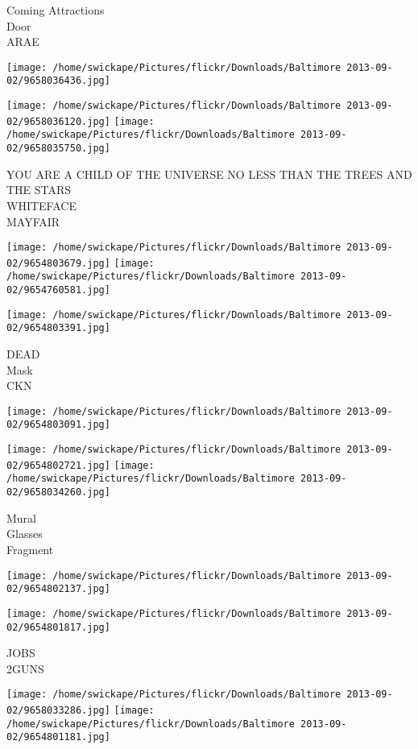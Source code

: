 \documentclass[10pt,letterpaper]{article}
\begin{document}
Coming Attractions\\
Door\\
ARAE
\pagebreak

\texttt{[image: /home/swickape/Pictures/flickr/Downloads/Baltimore 2013-09-02/9658036436.jpg]}

\vspace{0.25in}
\texttt{[image: /home/swickape/Pictures/flickr/Downloads/Baltimore 2013-09-02/9658036120.jpg]}
\texttt{[image: /home/swickape/Pictures/flickr/Downloads/Baltimore 2013-09-02/9658035750.jpg]}

YOU ARE A CHILD OF THE UNIVERSE NO LESS THAN THE TREES AND THE STARS\\
WHITEFACE\\
MAYFAIR
\pagebreak

\texttt{[image: /home/swickape/Pictures/flickr/Downloads/Baltimore 2013-09-02/9654803679.jpg]}
\texttt{[image: /home/swickape/Pictures/flickr/Downloads/Baltimore 2013-09-02/9654760581.jpg]}

\vspace{0.25in}
\texttt{[image: /home/swickape/Pictures/flickr/Downloads/Baltimore 2013-09-02/9654803391.jpg]}

DEAD\\
Mask\\
CKN
\pagebreak

\texttt{[image: /home/swickape/Pictures/flickr/Downloads/Baltimore 2013-09-02/9654803091.jpg]}

\vspace{0.25in}
\texttt{[image: /home/swickape/Pictures/flickr/Downloads/Baltimore 2013-09-02/9654802721.jpg]}
\texttt{[image: /home/swickape/Pictures/flickr/Downloads/Baltimore 2013-09-02/9658034260.jpg]}

Mural\\
Glasses\\
Fragment
\pagebreak

\texttt{[image: /home/swickape/Pictures/flickr/Downloads/Baltimore 2013-09-02/9654802137.jpg]}

\vspace{0.25in}
\texttt{[image: /home/swickape/Pictures/flickr/Downloads/Baltimore 2013-09-02/9654801817.jpg]}

JOBS\\
2GUNS
\pagebreak

\texttt{[image: /home/swickape/Pictures/flickr/Downloads/Baltimore 2013-09-02/9658033286.jpg]}
\texttt{[image: /home/swickape/Pictures/flickr/Downloads/Baltimore 2013-09-02/9654801181.jpg]}
\end{document}

